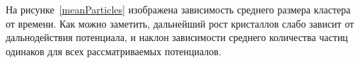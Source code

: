 На рисунке~\ref{meanParticles} изображена зависимость среднего размера кластера от времени. Как можно заметить, дальнейший рост кристаллов слабо зависит от дальнодействия потенциала, и наклон зависимости среднего количества частиц одинаков для всех рассматриваемых потенциалов.


%
%
%
%
